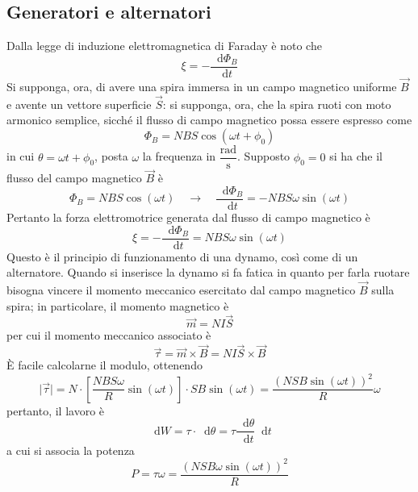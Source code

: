 \documentclass[a4paper]{extarticle}
\newcommand\dif{\mathop{}\!\mathrm{d}}
\begin{document}
\subsection{Generatori e alternatori}
Dalla legge di induzione elettromagnetica di Faraday è noto che
\[\xi=-\dfrac{\dif \Phi_B}{\dif t}\]
Si supponga, ora, di avere una spira immersa in un campo magnetico uniforme $\vec B$ e avente un vettore superficie $\vec S$: si supponga, ora, che la spira ruoti con moto armonico semplice, sicché il flusso di campo magnetico possa essere espresso come
\[\Phi_B = NBS \cos(\omega t + \phi_0)\]
in cui $\theta=\omega t + \phi_0$, posta $\omega$ la frequenza in $\dfrac{\text{rad}}{\text{s}}$. Supposto $\phi_0=0$ si ha che il flusso del campo magnetico $\vec B$ è
\[\Phi_B = NB S \cos(\omega t) \hspace{1em} \rightarrow \hspace{1em} \dfrac{\dif \Phi_B}{\dif t} = -NBS \omega \sin(\omega t)\]
Pertanto la forza elettromotrice generata dal flusso di campo magnetico è
\[\xi=-\dfrac{\dif \Phi_B}{\dif t} = NBS \omega \sin(\omega t)\]
Questo è il principio di funzionamento di una dynamo, così come di un alternatore. Quando si inserisce la dynamo si fa fatica in quanto per farla ruotare bisogna vincere il momento meccanico esercitato dal campo magnetico $\vec B$ sulla spira; in particolare, il momento magnetico è
\[\vec m = N I \vec S\]
per cui il momento meccanico associato è
\[\vec \tau = \vec m \times \vec B = NI \vec S \times \vec B\]
È facile calcolarne il modulo, ottenendo
\[\vert \vec \tau \vert = N \cdot \left[\dfrac{NBS \omega}{R}\sin(\omega t)\right] \cdot SB \sin(\omega t)= \dfrac{(NSB \sin(\omega t))^2}{R} \omega\]
pertanto, il lavoro è
\[\dif W = \tau \cdot \dif \theta = \tau \frac{\dif \theta}{\dif t} \dif t\]
a cui si associa la potenza
\[P=\tau \omega = \dfrac{(NSB \omega \sin(\omega t))^2}{R}\]
\end{document}
